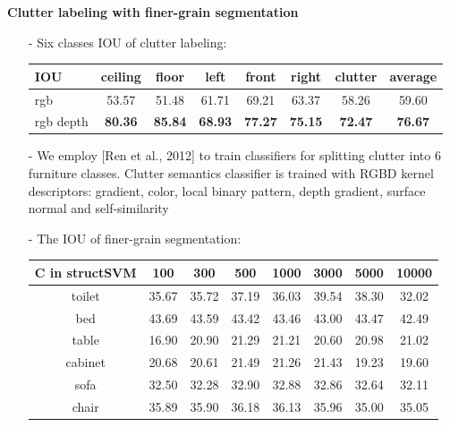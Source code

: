\documentclass[a0paper,landscape,final]{baposter}
\newcommand{\compresslist}{%
\setlength{\itemsep}{1pt}%
\setlength{\parskip}{0pt}%
\setlength{\parsep}{0pt}%
}
\begin{document}
\begin{poster}
{\vspace{-0.25cm}
{\bf Clutter labeling with finer-grain segmentation}
\vspace{-0.2cm}
\begin{itemize}[leftmargin=*]\compresslist
    \item[-] Six classes IOU of clutter labeling:\\
    \vspace{-0.6cm}
    \begin{table}[H]
        \centering
        {\footnotesize
        \begin{tabular}{|l||cccccc|c|}\hline
        IOU & ceiling & floor & left & front & right & clutter & average\\\hline
        rgb & 53.57 & 51.48 & 61.71 & 69.21 & 63.37 & 58.26 & 59.60\\
        rgb depth & {\bf 80.36} & {\bf 85.84} & {\bf 68.93} & {\bf 77.27} & {\bf 75.15} & {\bf 72.47} & {\bf 76.67}\\\hline
        \end{tabular}
        }
    \end{table}
    \vspace{-0.3cm}
    \item[-] We employ [Ren et al., 2012] to train classifiers for splitting clutter into 6 furniture classes. Clutter semantics classifier is trained with RGBD kernel descriptors: gradient, color, local binary pattern, depth gradient, surface normal and self-similarity
        \item[-] The IOU of finer-grain segmentation:
        \vspace{-0.3cm}
        \begin{table}[H]
        \centering
        \addtolength{\tabcolsep}{-2pt}
        {\small
        \begin{tabular}{|c||c|c|c|c|c|c|c|}
        \hline
         C in structSVM& 100        & 300        & 500        & 1000        & 3000        & 5000        & 10000\\
        \hline
        toilet &    35.67 &    35.72 &    37.19 &    36.03 &    39.54 &    38.30 &    32.02\\
        \hline
        bed &     43.69 &    43.59 &    43.42 &    43.46 &    43.00 &    43.47 &    42.49\\
        \hline
        table &   16.90 &    20.90 &    21.29 &    21.21 &    20.60 &    20.98 &    21.02\\
        \hline
        cabinet &    20.68 &    20.61 &    21.49 &    21.26 &    21.43 &    19.23 &    19.60\\
        \hline
        sofa &    32.50 &    32.28 &    32.90 &    32.88 &    32.86 &    32.64 &    32.11\\
        \hline
        chair &   35.89 &    35.90 &    36.18 &    36.13 &    35.96 &    35.00 &    35.05\\
        \hline
    \end{tabular}
    }
    \end{table}
\end{itemize}

}
\end{poster}
\end{document}
